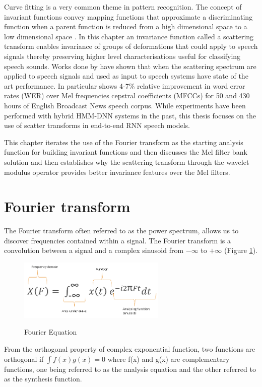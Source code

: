 Curve fitting is a very common theme in pattern recognition. The concept of invariant functions convey mapping functions that approximate a discriminating function when a parent function is reduced from a high dimensional space to a low dimensional space \cite{mallat2016understanding}.  In this chapter an invariance function called a scattering transform enables invariance of groups of deformations that could apply to speech signals thereby preserving higher level characterisations useful for classifying speech sounds. Works done by \citep{peddinti2014deep,zeghidour2016deep,anden2011multiscale,sainath2014deep} have shown that when the scattering spectrum are applied to speech signals and used as input to speech systems have state of the art performance.  In particular \cite{sainath2014deep} shows 4-7\% relative improvement in word error rates (WER) over Mel frequencies cepstral coefficients (MFCCs) for 50 and 430 hours of English Broadcast News speech corpus.  While experiments have been performed with hybrid HMM-DNN systems in the past, this thesis focuses on the use of scatter transforms in end-to-end RNN speech models.

This chapter iterates the use of the Fourier transform as the starting analysis function for building invariant functions and then discusses the Mel filter bank solution and then establishes why the scattering transform through the wavelet modulus operator provides better invariance features over the Mel filters.

\section{Fourier transform}\label{c4_fourier}
The Fourier transform often referred to as the power spectrum, allows us to discover frequencies contained within a signal.  The Fourier transform is a convolution between a signal and a complex sinusoid from $-\infty$ to $+\infty$ (Figure \ref{fig_4_1_fourier_eqn}). 

\begin{figure}
\centering
  \includegraphics[width=7cm]{thesis/images/fourier.png}\\
  \caption{Fourier Equation} \label{fig_4_1_fourier_eqn}
\end{figure}
From the orthogonal property of complex exponential function, two functions are orthogonal if $\int f(x)g(x)=0$ where f(x) and g(x) are complementary functions, one being referred to as the analysis equation and the other referred to as the synthesis function.

